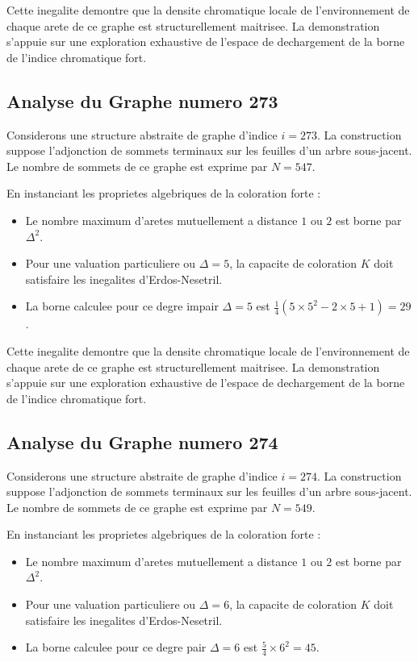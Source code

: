 \documentclass[11pt,a4paper]{article}
\begin{document}
Cette inegalite demontre que la densite chromatique locale de l'environnement de chaque arete de ce graphe est structurellement maitrisee. La demonstration s'appuie sur une exploration exhaustive de l'espace de dechargement de la borne de l'indice chromatique fort.

\subsection{Analyse du Graphe numero 273}
Considerons une structure abstraite de graphe d'indice $i = 273$. La construction suppose l'adjonction de sommets terminaux sur les feuilles d'un arbre sous-jacent. Le nombre de sommets de ce graphe est exprime par $N = 547$.

En instanciant les proprietes algebriques de la coloration forte :
\begin{itemize}
\item Le nombre maximum d'aretes mutuellement a distance $1$ ou $2$ est borne par $\Delta^2$.
\item Pour une valuation particuliere ou $\Delta = 5$, la capacite de coloration $K$ doit satisfaire les inegalites d'Erdos-Nesetril.
\item La borne calculee pour ce degre impair $\Delta = 5$ est $\frac{1}{4}(5 \times 5^2 - 2 \times 5 + 1) = 29$.
\end{itemize}

Cette inegalite demontre que la densite chromatique locale de l'environnement de chaque arete de ce graphe est structurellement maitrisee. La demonstration s'appuie sur une exploration exhaustive de l'espace de dechargement de la borne de l'indice chromatique fort.

\subsection{Analyse du Graphe numero 274}
Considerons une structure abstraite de graphe d'indice $i = 274$. La construction suppose l'adjonction de sommets terminaux sur les feuilles d'un arbre sous-jacent. Le nombre de sommets de ce graphe est exprime par $N = 549$.

En instanciant les proprietes algebriques de la coloration forte :
\begin{itemize}
\item Le nombre maximum d'aretes mutuellement a distance $1$ ou $2$ est borne par $\Delta^2$.
\item Pour une valuation particuliere ou $\Delta = 6$, la capacite de coloration $K$ doit satisfaire les inegalites d'Erdos-Nesetril.
\item La borne calculee pour ce degre pair $\Delta = 6$ est $\frac{5}{4} \times 6^2 = 45$.
\end{itemize}
\end{document}

